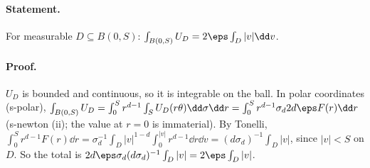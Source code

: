 \paragraph{Statement.} For measurable $D\subseteq B(0,S)$: $\int_{B(0,S)}U_D=2\eps\int_D|v|\dd v$.
\paragraph{Proof.} $U_D$ is bounded and continuous, so it is integrable on the ball. In polar coordinates (s-polar),
$\int_{B(0,S)}U_D=\int_0^Sr^{d-1}\int_SU_D(r\theta)\dd\sigma\dd r=\int_0^Sr^{d-1}\sigma_d2d\eps F(r)\dd r$ (s-newton (ii); the value at $r=0$ is immaterial).
By Tonelli, $\int_0^Sr^{d-1}F(r)\dd r=\sigma_d^{-1}\int_D|v|^{1-d}\int_0^{|v|}r^{d-1}\dd r\dd v=(d\sigma_d)^{-1}\int_D|v|$, since $|v|<S$ on $D$. So the total is
$2d\eps\sigma_d(d\sigma_d)^{-1}\int_D|v|=2\eps\int_D|v|$.
